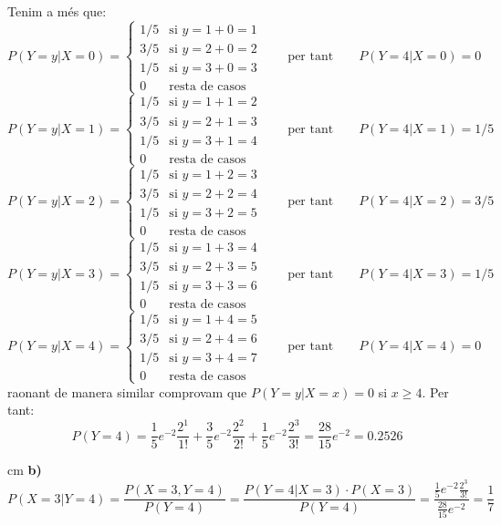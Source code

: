 \documentclass{article}
\begin{document}
Tenim a m\'es que:
\[
P(Y = y | X = 0) = \begin{cases}
1/5 & \text{si } y = 1+0=1\\
3/5 & \text{si } y = 2+0=2\\
1/5 & \text{si } y = 3+0=3 \\
0 & \text{resta de casos}
\end{cases}
\qquad \text{per tant} \qquad P(Y = 4 | X = 0)=0
\]
\[
P(Y = y | X = 1) = \begin{cases}
1/5 & \text{si } y = 1+1=2\\
3/5 & \text{si } y = 2+1=3\\
1/5 & \text{si } y = 3+1=4 \\
0 & \text{resta de casos}
\end{cases}
\qquad \text{per tant} \qquad P(Y = 4 | X = 1)=1/5
\]
\[
P(Y = y | X = 2) = \begin{cases}
1/5 & \text{si } y = 1+2=3\\
3/5 & \text{si } y = 2+2=4\\
1/5 & \text{si } y = 3+2=5 \\
0 & \text{resta de casos}
\end{cases}
\qquad \text{per tant} \qquad P(Y = 4 | X = 2)=3/5
\]
\[
P(Y = y | X = 3) = \begin{cases}
1/5 & \text{si } y = 1+3=4\\
3/5 & \text{si } y = 2+3=5\\
1/5 & \text{si } y = 3+3=6 \\
0 & \text{resta de casos}
\end{cases}
\qquad \text{per tant} \qquad P(Y = 4 | X = 3)=1/5
\]
\[
P(Y = y | X = 4) = \begin{cases}
1/5 & \text{si } y = 1+4=5\\
3/5 & \text{si } y = 2+4=6\\
1/5 & \text{si } y = 3+4=7 \\
0 & \text{resta de casos}
\end{cases}
\qquad \text{per tant} \qquad P(Y = 4 | X = 4)=0
\]
\noindent
raonant de manera similar comprovam que $P(Y = y | X = x)=0$ si $x \geq 4$. Per tant:
\[
P(Y=4)=\frac{1}{5} e^{-2} \frac{2^1}{1!} + \frac{3}{5} e^{-2} \frac{2^2}{2!}
+ \frac{1}{5} e^{-2} \frac{2^3}{3!}=\frac{28}{15} e^{-2}=0.2526
\]

 cm
\noindent
\textbf{b)} 
\[
P(X=3|Y=4)=\frac{ P(X=3, Y=4) }{P(Y=4)}=\frac{P(Y=4|X=3) \cdot P(X=3)}{P(Y=4)}=
\frac{ \frac{1}{5} e^{-2} \frac{2^3}{3!} }{\frac{28}{15} e^{-2}}=\frac{1}{7}
\]
\end{document}
